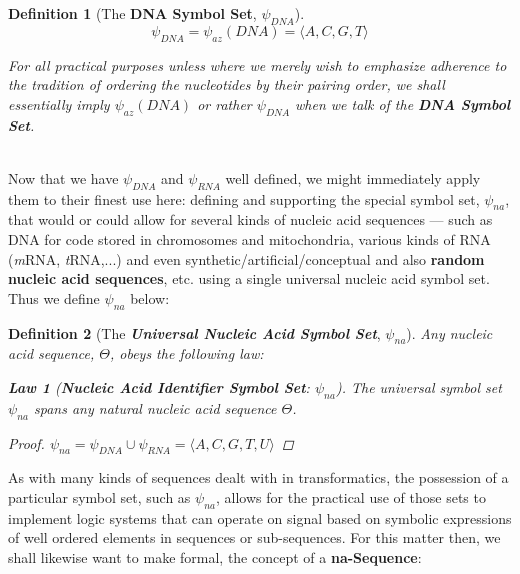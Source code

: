 \documentclass[a4paper, 18pt]{book} %
\newtheorem{defn}{Definition}
\newtheorem{law}{Law}
\begin{document}
{\begin{minipage}{0.9\textwidth}
\begin{defn}[The \textbf{DNA Symbol Set}, $\psi_{DNA}$]
\begin{equation}
\label{EQDNASS}
\psi_{DNA} = \psi_{az}(DNA) = \langle A, C, G, T\rangle
\end{equation}

For all practical purposes unless where we merely wish to emphasize adherence to the tradition of ordering the nucleotides by their pairing order, we shall essentially imply $\psi_{az}(DNA)$ or rather $\psi_{DNA}$ when we talk of the \textbf{DNA Symbol Set}.

\end{defn}

\end{minipage}}
\\


Now that we have $\psi_{DNA}$ and $\psi_{RNA}$ well defined, we might immediately apply them to their finest use here: defining and supporting the special symbol set, $\psi_{na}$, that would or could allow for several kinds of nucleic acid sequences --- such as DNA for code stored in chromosomes and mitochondria, various kinds of RNA (\textit{m}RNA, \textit{t}RNA,...) and even synthetic/artificial/conceptual and also \textbf{random nucleic acid sequences}, etc. using a single universal nucleic acid symbol set. Thus we define $\psi_{na}$ below:


\begin{defn}[The \textit{\textbf{Universal Nucleic Acid Symbol Set}}, $\psi_{na}$]
\label{DEFUNA}
Any nucleic acid sequence, $\Theta$, obeys the following law:

\begin{law}[\textbf{Nucleic Acid Identifier Symbol Set}: $\psi_{na}$]
\label{LAWNA}
 The universal symbol set $\psi_{na}$ spans any natural nucleic acid sequence $\Theta$.
\begin{proof}
$\psi_{na} = \psi_{DNA} \cup \psi_{RNA} = \langle A, C, G, T, U \rangle$
\end{proof}
\end{law}
\end{defn}


As with many kinds of sequences dealt with in transformatics, the possession of a particular symbol set, such as $\psi_{na}$, allows for the practical use of those sets to implement logic systems that can operate on signal based on symbolic expressions of well ordered elements in sequences or sub-sequences. For this matter then, we shall likewise want to make formal, the concept of a \textbf{na-Sequence}:
\end{document}
